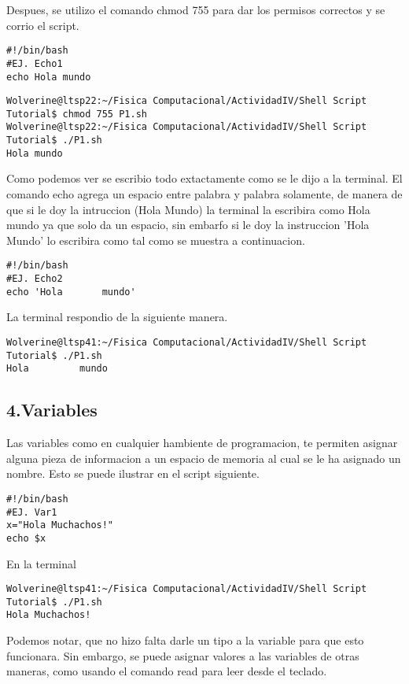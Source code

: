 \documentclass[a4paper]{article}
\begin{document}
Despues, se utilizo el comando chmod 755 para dar los permisos correctos y se corrio el script.
\begin{verbatim}
#!/bin/bash
#EJ. Echo1
echo Hola mundo
\end{verbatim}



\begin{verbatim}
Wolverine@ltsp22:~/Fisica Computacional/ActividadIV/Shell Script Tutorial$ chmod 755 P1.sh
Wolverine@ltsp22:~/Fisica Computacional/ActividadIV/Shell Script Tutorial$ ./P1.sh
Hola mundo
\end{verbatim}

Como podemos ver se escribio todo extactamente como se le dijo a la terminal. El comando echo agrega un espacio entre palabra y palabra solamente, de manera de que si le doy la intruccion (Hola      Mundo) la terminal la escribira como Hola mundo ya que solo da un espacio, sin embarfo si le doy la instruccion 'Hola		Mundo' lo escribira como tal como se muestra a continuacion. 

\begin{verbatim}
#!/bin/bash
#EJ. Echo2
echo 'Hola		 mundo'
\end{verbatim}
La terminal respondio de la siguiente manera. 
\begin{verbatim}
Wolverine@ltsp41:~/Fisica Computacional/ActividadIV/Shell Script Tutorial$ ./P1.sh
Hola		 mundo

\end{verbatim}

\subsection{4.Variables}

Las variables como en cualquier hambiente de programacion, te permiten asignar alguna pieza de informacion a un espacio de memoria al cual se le ha asignado un nombre. Esto se puede ilustrar en el script siguiente. 

\begin{verbatim}
#!/bin/bash
#EJ. Var1
x="Hola Muchachos!"
echo $x
\end{verbatim}
En la terminal 

\begin{verbatim}
Wolverine@ltsp41:~/Fisica Computacional/ActividadIV/Shell Script Tutorial$ ./P1.sh
Hola Muchachos!

\end{verbatim}

Podemos notar, que no hizo falta darle un tipo a la variable para que esto funcionara. Sin embargo, se puede asignar valores a las variables de otras maneras, como usando el comando read para leer desde el teclado. 
\end{document}
